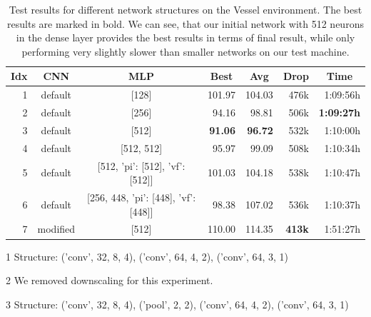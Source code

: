 \begin{table}[htp]
    \begin{center}
        \begin{threeparttable}
            \begin{tabular}{rccrrrr}
                \toprule
                \multicolumn{1}{c}{Idx} & \multicolumn{1}{c}{CNN} & \multicolumn{1}{c}{MLP} & \multicolumn{1}{c}{Best} & \multicolumn{1}{c}{Avg} & \multicolumn{1}{c}{Drop} & \multicolumn{1}{c}{Time}\\
                \midrule
                1 & default\tnote{1} & [128] & 101.97 & 104.03 & 476k & 1:09:56h \\
                2 & default\tnote{1} & [256] & 94.16 & 98.81 & 506k & \textbf{1:09:27h} \\
                3 & default\tnote{1} & [512] & \textbf{91.06} & \textbf{96.72} & 532k & 1:10:00h \\
                4 & default\tnote{1} & [512, 512] & 95.97 & 99.09 & 508k & 1:10:34h \\
                5 & default\tnote{1} & [512, {'pi': [512], 'vf': [512]}] & 101.03 & 104.18 & 538k & 1:10:47h \\
                6 & default\tnote{1} & [256, 448, {'pi': [448], 'vf': [448]}] & 98.38 & 107.02 & 536k & 1:10:37h \\
                7\tnote{2} & modified\tnote{3} & [512] & 110.00 & 114.35 & \textbf{413k} & 1:51:27h \\
                \bottomrule
            \end{tabular}
            \begin{tablenotes} \footnotesize
                \item[1] Structure: ('conv', 32, 8, 4), ('conv', 64, 4, 2), ('conv', 64, 3, 1)
                \item[2] We removed downscaling for this experiment.
                \item[3] Structure: ('conv', 32, 8, 4), ('pool', 2, 2), ('conv', 64, 4, 2), ('conv', 64, 3, 1)
            \end{tablenotes}

        \end{threeparttable}
        
    \end{center}
    \caption[Test Results for Different Network Structures on the Vessel Environment]{Test results for different network structures on the Vessel environment. The best results are marked in bold. We can see, that our initial network with 512 neurons in the dense layer provides the best results in terms of final result, while only performing very slightly slower than smaller networks on our test machine.} \label{tab:Eval/NetworkStructure/Vessel}
\end{table}

